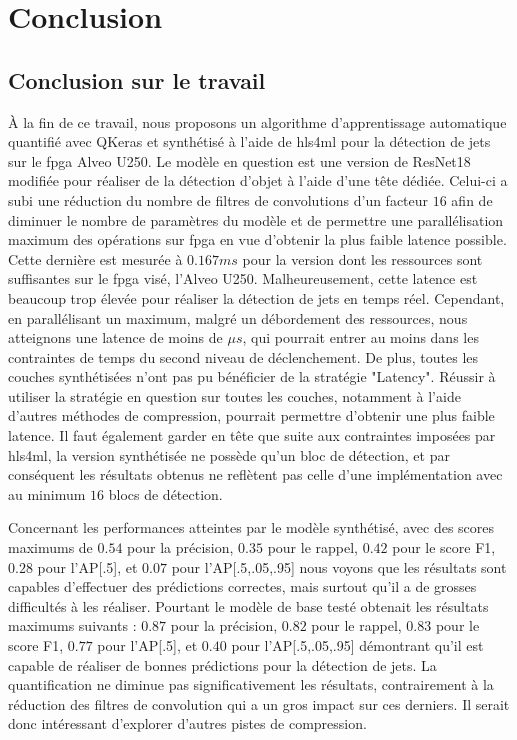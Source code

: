 
\chapter{Conclusion} %

\label{Conclusion} %


\section{Conclusion sur le travail}

À la fin de ce travail, nous proposons un algorithme d'apprentissage automatique quantifié avec QKeras et synthétisé à l'aide de \acrshort{hls4ml} pour la détection de jets sur le \acrshort{fpga} Alveo U250. Le modèle en question est une version de ResNet18 modifiée pour réaliser de la détection d'objet à l'aide d'une tête dédiée. Celui-ci a subi une réduction du nombre de filtres de convolutions d'un facteur $16$ afin de diminuer le nombre de paramètres du modèle et de permettre une parallélisation maximum des opérations sur \acrshort{fpga} en vue d'obtenir la plus faible latence possible. Cette dernière est mesurée à $0.167 ms$ pour la version dont les ressources sont suffisantes sur le \acrshort{fpga} visé, l'Alveo U250. Malheureusement, cette latence est beaucoup trop élevée pour réaliser la détection de jets en temps réel. Cependant, en parallélisant un maximum, malgré un débordement des ressources, nous atteignons une latence de moins de $\mu s$, qui pourrait entrer au moins dans les contraintes de temps du second niveau de déclenchement. De plus, toutes les couches synthétisées n'ont pas pu bénéficier de la stratégie "Latency". Réussir à utiliser la stratégie en question sur toutes les couches, notamment à l'aide d'autres méthodes de compression, pourrait permettre d'obtenir une plus faible latence.
Il faut également garder en tête que suite aux contraintes imposées par \acrshort{hls4ml}, la version synthétisée ne possède qu'un bloc de détection, et par conséquent les résultats obtenus ne reflètent pas celle d'une implémentation avec au minimum $16$ blocs de détection.

Concernant les performances atteintes par le modèle synthétisé, avec des scores maximums de $0.54$ pour la précision, $0.35$ pour le rappel, $0.42$ pour le score F1, $0.28$ pour l'AP[.5], et $0.07$ pour l'AP[.5,.05,.95] nous voyons que les résultats sont capables d'effectuer des prédictions correctes, mais surtout qu'il a de grosses difficultés à les réaliser. Pourtant le modèle de base testé obtenait les résultats maximums suivants : $0.87$ pour la précision, $0.82$ pour le rappel, $0.83$ pour le score F1, $0.77$ pour l'AP[.5], et $0.40$ pour l'AP[.5,.05,.95] démontrant qu'il est capable de réaliser de bonnes prédictions pour la détection de jets. La quantification ne diminue pas significativement les résultats, contrairement à la réduction des filtres de convolution qui a un gros impact sur ces derniers. Il serait donc intéressant d'explorer d'autres pistes de compression. 

